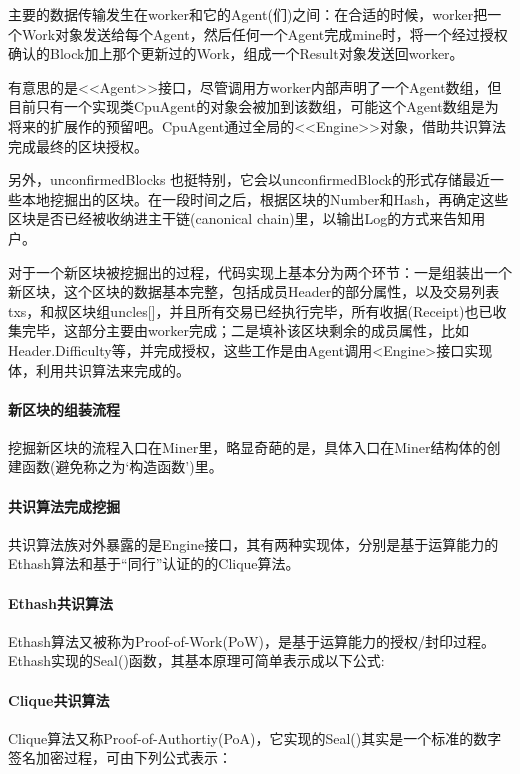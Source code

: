 \documentclass[UTF8]{ctexart}
\begin{document}
主要的数据传输发生在worker和它的Agent(们)之间：在合适的时候，worker把一个Work对象发送给每个Agent，然后任何一个Agent完成mine时，将一个经过授权确认的Block加上那个更新过的Work，组成一个Result对象发送回worker。

有意思的是<<Agent>>接口，尽管调用方worker内部声明了一个Agent数组，但目前只有一个实现类CpuAgent的对象会被加到该数组，可能这个Agent数组是为将来的扩展作的预留吧。CpuAgent通过全局的<<Engine>>对象，借助共识算法完成最终的区块授权。

另外，unconfirmedBlocks 也挺特别，它会以unconfirmedBlock的形式存储最近一些本地挖掘出的区块。在一段时间之后，根据区块的Number和Hash，再确定这些区块是否已经被收纳进主干链(canonical chain)里，以输出Log的方式来告知用户。

对于一个新区块被挖掘出的过程，代码实现上基本分为两个环节：一是组装出一个新区块，这个区块的数据基本完整，包括成员Header的部分属性，以及交易列表txs，和叔区块组uncles[]，并且所有交易已经执行完毕，所有收据(Receipt)也已收集完毕，这部分主要由worker完成；二是填补该区块剩余的成员属性，比如Header.Difficulty等，并完成授权，这些工作是由Agent调用<Engine>接口实现体，利用共识算法来完成的。

\paragraph{新区块的组装流程}

挖掘新区块的流程入口在Miner里，略显奇葩的是，具体入口在Miner结构体的创建函数(避免称之为‘构造函数’)里。

\paragraph{共识算法完成挖掘}

共识算法族对外暴露的是Engine接口，其有两种实现体，分别是基于运算能力的Ethash算法和基于“同行”认证的的Clique算法。

\paragraph{Ethash共识算法}

Ethash算法又被称为Proof-of-Work(PoW)，是基于运算能力的授权/封印过程。Ethash实现的Seal()函数，其基本原理可简单表示成以下公式:

\paragraph{Clique共识算法}
Clique算法又称Proof-of-Authortiy(PoA)，它实现的Seal()其实是一个标准的数字签名加密过程，可由下列公式表示：

\ifx\allfiles\undefined
\end{document}
